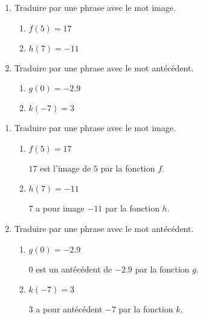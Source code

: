 \begin{exercice}    
    \vspace*{-3mm}
    \begin{enumerate}
        \item Traduire par une phrase avec le mot image.
        \vspace*{-3mm}
        \begin{multicols}{2}
            \begin{enumerate}
                \item $f(5)=17$
                \item $h(7)=-11$
            \end{enumerate}               
        \end{multicols}
        \item Traduire par une phrase avec le mot antécédent.
        \vspace*{-3mm}
        \begin{multicols}{2}
            \begin{enumerate}
                \item $g(0)=-2.9$
                \item $k(-7)=3$
            \end{enumerate}
        \end{multicols}
    \end{enumerate}    
\end{exercice}
\begin{corrige}
    \begin{enumerate}
        \item Traduire par une phrase avec le mot image.
        \begin{enumerate}
            \item $f(5)=17$ 
            
            {\red $17$ est l'image de $5$ par la fonction $f$.}
            \item $h(7)=-11$ 
            
            {\red $7$ a pour image $-11$ par la fonction $h$.}
        \end{enumerate}
        \item Traduire par une phrase avec le mot antécédent.
        \begin{enumerate}
            \item $g(0)=-2.9$
            
            {\red $0$ est un antécédent de $-2.9$ par la fonction $g$.}
            \item $k(-7)=3$
            
            {\red $3$ a pour antécédent $-7$ par la fonction $k$.}
        \end{enumerate}
    \end{enumerate}
\end{corrige}
